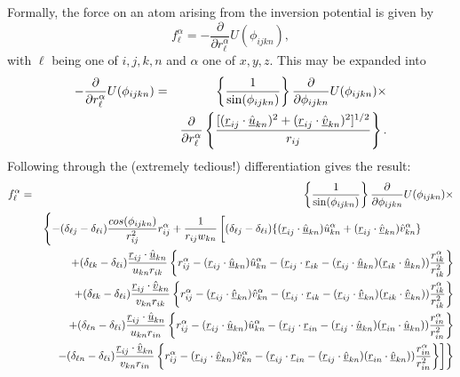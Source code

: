 Formally, the force on an atom arising from the inversion potential is given by
\begin{equation}
f_{\ell}^{\alpha}=-\frac{\partial}{\partial
r_{\ell}^{\alpha}}U(\phi_{ijkn}),
\end{equation}
with $\ell$ being one of $i,j,k,n$ and $\alpha$ one of $x,y,z$. This
may be expanded into
\begin{eqnarray}
-\frac{\partial}{\partial r_{\ell}^{\alpha}}U(\phi_{ijkn})&=&
\left\{\frac{1}{\sin(\phi_{ijkn})}\right\}
\frac{\partial}{\partial \phi_{ijkn}}U(\phi_{ijkn})\times \nonumber \\
& & \frac{\partial}{\partial r_{\ell}^{\alpha}}
\left\{\frac{[(\mbox{$\underline{r}$}_{ij}\cdot\mbox{$\underline{\hat{u}}$}_{kn})^{2}
+(\mbox{$\underline{r}$}_{ij}\cdot\mbox{$\underline{\hat{v}}$}_{kn})^{2}]^{1/2}}
{r_{ij}}\right \}.
\end{eqnarray}
Following through the (extremely tedious!) differentiation gives the result:
\begin{eqnarray}
f_{\ell}^{\alpha} &=&
\left\{\frac{1}{\sin(\phi_{ijkn})}\right\}
\frac{\partial}{\partial \phi_{ijkn}}U(\phi_{ijkn})\times \\
& &
\left\{-(\delta_{\ell j}-\delta_{\ell i})\frac{cos(\phi_{ijkn})}
{r_{ij}^{2}}r_{ij}^{\alpha} +\frac{1}{r_{ij}w_{kn}}\left [
(\delta_{\ell j}-\delta_{\ell i}) 
\{(\vek{r}_{ij}\cdot\vek{\hat{u}}_{kn})\hat{u}_{kn}^{\alpha}+
(\vek{r}_{ij}\cdot\vek{\hat{v}}_{kn})\hat{v}_{kn}^{\alpha}\} 
\phantom{\left\{\frac{a_{a}^{a}}{a_{a}^{a}}\right\}}
\right. \right. \nonumber \\
& & + (\delta_{\ell k}-\delta_{\ell i})
\frac{\vek{r}_{ij}\cdot\vek{\hat{u}}_{kn}}{u_{kn}r_{ik}}\left \{
r_{ij}^{\alpha}-(\vek{r}_{ij}\cdot\vek{\hat{u}}_{kn})\hat{u}_{kn}^{\alpha}
-(\vek{r}_{ij}\cdot\vek{r}_{ik}-(\vek{r}_{ij}\cdot\vek{\hat{u}}_{kn})
(\vek{r}_{ik}\cdot\vek{\hat{u}}_{kn}))\frac{r_{ik}^{\alpha}}{r_{ik}^{2}}
\right \} \nonumber \\
& & + (\delta_{\ell k}-\delta_{\ell i})
\frac{\vek{r}_{ij}\cdot\vek{\hat{v}}_{kn}}{v_{kn}r_{ik}}\left \{
r_{ij}^{\alpha}-(\vek{r}_{ij}\cdot\vek{\hat{v}}_{kn})\hat{v}_{kn}^{\alpha}
-(\vek{r}_{ij}\cdot\vek{r}_{ik}-(\vek{r}_{ij}\cdot\vek{\hat{v}}_{kn})
(\vek{r}_{ik}\cdot\vek{\hat{v}}_{kn}))\frac{r_{ik}^{\alpha}}{r_{ik}^{2}}
\right \} \nonumber \\
& &+ (\delta_{\ell n}-\delta_{\ell i})
\frac{\vek{r}_{ij}\cdot\vek{\hat{u}}_{kn}}{u_{kn}r_{in}}\left \{
r_{ij}^{\alpha}-(\vek{r}_{ij}\cdot\vek{\hat{u}}_{kn})\hat{u}_{kn}^{\alpha}
-(\vek{r}_{ij}\cdot\vek{r}_{in}-(\vek{r}_{ij}\cdot\vek{\hat{u}}_{kn})
(\vek{r}_{in}\cdot\vek{\hat{u}}_{kn}))\frac{r_{in}^{\alpha}}{r_{in}^{2}}
\right \} \nonumber \\
& & \left . \left .- (\delta_{\ell n}-\delta_{\ell i})
\frac{\vek{r}_{ij}\cdot\vek{\hat{v}}_{kn}}{v_{kn}r_{in}}\left \{
r_{ij}^{\alpha}-(\vek{r}_{ij}\cdot\vek{\hat{v}}_{kn})\hat{v}_{kn}^{\alpha}
-(\vek{r}_{ij}\cdot\vek{r}_{in}-(\vek{r}_{ij}\cdot\vek{\hat{v}}_{kn})
(\vek{r}_{in}\cdot\vek{\hat{v}}_{kn}))\frac{r_{in}^{\alpha}}{r_{in}^{2}}
\right \} \right ] \right \} \nonumber 
\end{eqnarray}
